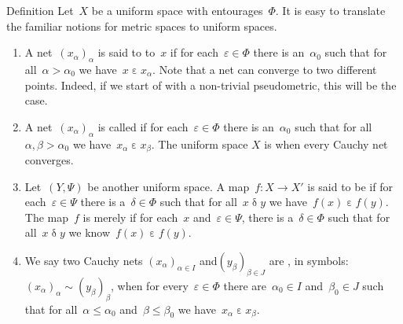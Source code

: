 \documentclass[b]{subfiles}
\begin{document}
\begin{parsec}%
\begin{point}{Definition}%
Let~$X$ be a uniform space with entourages~$\Phi$.
It is easy to translate the familiar notions for
    metric spaces to uniform spaces.
\begin{enumerate}
    \item A net~$(x_\alpha)_\alpha$ is said to
             to~$x$
            if for each~$\varepsilon \in \Phi$
            there is an~$\alpha_0$
            such that for all~$\alpha > \alpha_0$
                we have~$x \mathrel\varepsilon x_\alpha$.
Note that a net can converge to two different points.
Indeed, if we start of with a non-trivial pseudometric,
this will be the case.
\item A net~$(x_\alpha)_\alpha$ is called 
        if for each~$\varepsilon \in \Phi$
            there is an~$\alpha_0$
            such that for all~$\alpha,\beta > \alpha_0$
            we have~$x_\alpha \mathrel\varepsilon x_\beta$.
The uniform space $X$ is 
    when every Cauchy net converges.
\item
Let~$(Y,\Psi)$ be another uniform space.
A map~$f\colon X \to X'$
is said to be 
if for each~$\varepsilon \in \Psi$
there is a~$\delta \in \Phi$
such that for all~$x \mathrel\delta y$
we have~$f(x) \mathrel\varepsilon f(y)$.
The map~$f$ is merely 
if for each~$x$ and~$\varepsilon\in\Psi$,
there is a~$\delta \in \Phi$
such that for all~$x \mathrel{\delta} y$
we know~$f(x) \mathrel\varepsilon f(y)$.
\item
We say two Cauchy nets
$(x_\alpha)_{\alpha\in I}$
and$(y_\beta)_{\beta\in J}$ are ,
in symbols: $(x_\alpha)_\alpha \sim (y_\beta)_\beta$,
when for every~$\varepsilon \in \Phi$
there are~$\alpha_0 \in I$ and~$\beta_0 \in J$
such that for all~$\alpha \leq \alpha_0$ and~$\beta \leq \beta_0$
we have~$x_\alpha \mathrel\varepsilon x_\beta$.


\end{enumerate}
\end{point}
\end{parsec}
\end{document}
